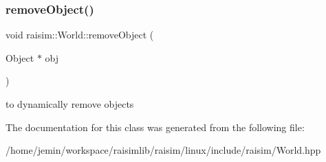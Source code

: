 \subsubsection{\texorpdfstring{remove\+Object()}{removeObject()}}
{\footnotesize\ttfamily void raisim\+::\+World\+::remove\+Object (\begin{DoxyParamCaption}\item[{Object $\ast$}]{obj }\end{DoxyParamCaption})}

to dynamically remove objects 

The documentation for this class was generated from the following file\+:\begin{DoxyCompactItemize}
\item 
/home/jemin/workspace/raisimlib/raisim/linux/include/raisim/World.\+hpp\end{DoxyCompactItemize}
